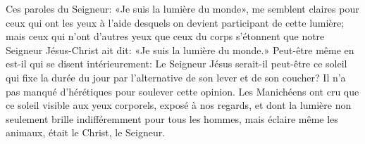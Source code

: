 Ces paroles du Seigneur: «Je suis la lumière du monde»,
	me semblent claires pour ceux qui ont les yeux
		à l’aide desquels on devient participant de cette lumière;
	mais ceux qui n’ont d’autres yeux que ceux du corps
	s’étonnent que notre Seigneur Jésus-Christ ait dit:
	«Je suis la lumière du monde.»
Peut-être même en est-il qui se disent intérieurement:
	Le Seigneur Jésus serait-il peut-être ce soleil
	qui fixe la durée du jour par l’alternative de son lever et de son coucher?
	Il n’a pas manqué d’hérétiques pour soulever cette opinion.
Les Manichéens ont cru que ce soleil visible aux yeux corporels,
	exposé à nos regards,
	et dont la lumière non seulement brille indifféremment pour tous les hommes,
	mais éclaire même les animaux,
	était le Christ, le Seigneur.
